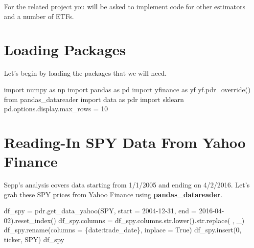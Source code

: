 \documentclass[
  letterpaper,
  DIV=11,
  numbers=noendperiod]{scrreprt}
\newenvironment{Shaded}{\begin{snugshade}}{\end{snugshade}}
\newcommand{\BuiltInTok}[1]{\textcolor[rgb]{0.00,0.23,0.31}{#1}}
\newcommand{\DecValTok}[1]{\textcolor[rgb]{0.68,0.00,0.00}{#1}}
\newcommand{\ImportTok}[1]{\textcolor[rgb]{0.00,0.46,0.62}{#1}}
\newcommand{\NormalTok}[1]{\textcolor[rgb]{0.00,0.23,0.31}{#1}}
\newcommand{\OperatorTok}[1]{\textcolor[rgb]{0.37,0.37,0.37}{#1}}
\newcommand{\StringTok}[1]{\textcolor[rgb]{0.13,0.47,0.30}{#1}}
\newcommand{\VariableTok}[1]{\textcolor[rgb]{0.07,0.07,0.07}{#1}}
\begin{document}
For the related project you will be asked to implement code for other
estimators and a number of ETFs.

\hypertarget{loading-packages-7}{%
\section{Loading Packages}\label{loading-packages-7}}

Let's begin by loading the packages that we will need.

\begin{Shaded}
\begin{Highlighting}[]
\ImportTok{import}\NormalTok{ numpy }\ImportTok{as}\NormalTok{ np}
\ImportTok{import}\NormalTok{ pandas }\ImportTok{as}\NormalTok{ pd}
\ImportTok{import}\NormalTok{ yfinance }\ImportTok{as}\NormalTok{ yf}
\NormalTok{yf.pdr\_override()}
\ImportTok{from}\NormalTok{ pandas\_datareader }\ImportTok{import}\NormalTok{ data }\ImportTok{as}\NormalTok{ pdr}
\ImportTok{import}\NormalTok{ sklearn}
\NormalTok{pd.options.display.max\_rows }\OperatorTok{=} \DecValTok{10}
\end{Highlighting}
\end{Shaded}

\hypertarget{reading-in-spy-data-from-yahoo-finance}{%
\section{Reading-In SPY Data From Yahoo
Finance}\label{reading-in-spy-data-from-yahoo-finance}}

Sepp's analysis covers data starting from 1/1/2005 and ending on
4/2/2016. Let's grab these SPY prices from Yahoo Finance using
\textbf{pandas\_datareader}.

\begin{Shaded}
\begin{Highlighting}[]
\NormalTok{df\_spy }\OperatorTok{=}\NormalTok{ pdr.get\_data\_yahoo(}\StringTok{\textquotesingle{}SPY\textquotesingle{}}\NormalTok{, start }\OperatorTok{=} \StringTok{\textquotesingle{}2004{-}12{-}31\textquotesingle{}}\NormalTok{, end }\OperatorTok{=} \StringTok{\textquotesingle{}2016{-}04{-}02\textquotesingle{}}\NormalTok{).reset\_index()}
\NormalTok{df\_spy.columns }\OperatorTok{=}\NormalTok{ df\_spy.columns.}\BuiltInTok{str}\NormalTok{.lower().}\BuiltInTok{str}\NormalTok{.replace(}\StringTok{\textquotesingle{} \textquotesingle{}}\NormalTok{, }\StringTok{\textquotesingle{}\_\textquotesingle{}}\NormalTok{)}
\NormalTok{df\_spy.rename(columns }\OperatorTok{=}\NormalTok{ \{}\StringTok{\textquotesingle{}date\textquotesingle{}}\NormalTok{:}\StringTok{\textquotesingle{}trade\_date\textquotesingle{}}\NormalTok{\}, inplace }\OperatorTok{=} \VariableTok{True}\NormalTok{)}
\NormalTok{df\_spy.insert(}\DecValTok{0}\NormalTok{, }\StringTok{\textquotesingle{}ticker\textquotesingle{}}\NormalTok{, }\StringTok{\textquotesingle{}SPY\textquotesingle{}}\NormalTok{)}
\NormalTok{df\_spy}
\end{Highlighting}
\end{Shaded}
\end{document}

